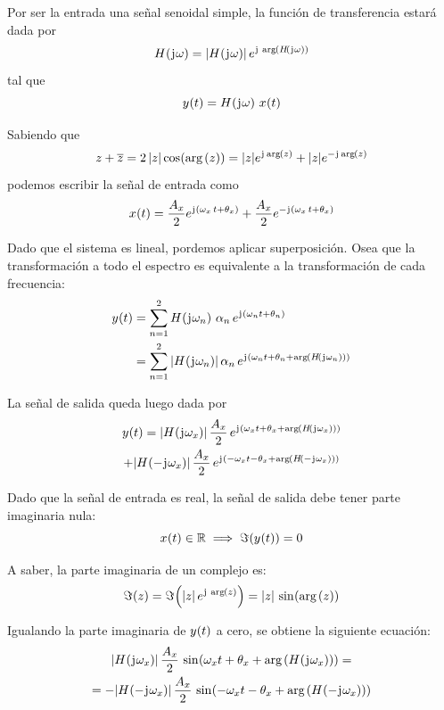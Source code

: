 Por ser la entrada una señal senoidal simple, la función de transferencia estará dada por
\[
    \fx[H]{\iu \omega} = \norm{\fx[H]{\iu \omega}} \, e^{\iu \, \fx[\arg]{\fx[H]{\iu \omega}}}
\]
tal que
\[
    \fx[y]{t} = \fx[H]{\iu \omega} \, \fx[x]{t}
\]

Sabiendo que
\[
    z + \conj{z} = 2 \, \norm{z} \fx[\cos]{\fx[\arg]{z}}
    = \norm{z} e^{\iu \fx[\arg]{z}} + \norm{z} e^{- \iu \fx[\arg]{z}}
\]
podemos escribir la señal de entrada como
\[
    \fx[x]{t} = \frac{A_x}{2} e^{\iu \inParentheses{\omega_x \, t + \theta_x}}
    + \frac{A_x}{2} e^{- \iu \inParentheses{\omega_x \, t + \theta_x}}
\]

Dado que el sistema es lineal, pordemos aplicar superposición.
Osea que la transformación a todo el espectro es equivalente a la transformación de cada frecuencia:
\begin{align*}
    \fx[y]{t} & = \sum_{\nth=1}^{2} \fx[H]{\iu \omega_\nth}
    \, \alpha_\nth
    \, e^{\iu \inParentheses{\omega_\nth t + \theta_\nth}}
    \\
    & = \sum_{\nth=1}^{2} \norm{\fx[H]{\iu \omega_\nth}}
    \, \alpha_\nth
    \, e^{\iu \inParentheses{\omega_\nth t + \theta_\nth + \fx[\arg]{\fx[H]{\iu \omega_\nth}}}}
\end{align*}

La señal de salida queda luego dada por
\begin{multline*}
    \fx[y]{t} = \norm{\fx[H]{\iu \omega_x}}
    \, \frac{A_x}{2}
    \, e^{\iu \inParentheses{\omega_x t + \theta_x + \fx[\arg]{\fx[H]{\iu \omega_x}}}}
    \\
    + \norm{\fx[H]{- \iu \omega_x}}
    \, \frac{A_x}{2}
    \, e^{\iu \inParentheses{- \omega_x t - \theta_x + \fx[\arg]{\fx[H]{- \iu \omega_x}}}}
\end{multline*}

Dado que la señal de entrada es real, la señal de salida debe tener parte imaginaria nula:
\begin{equation*}
    \fx[x]{t} \in \setR \implies \fx[\Im]{\fx[y]{t}} = 0
\end{equation*}

A saber, la parte imaginaria de un complejo es:
\begin{equation*}
    \fx[\Im]{z} = \fx[\Im]{\norm{z} \, e^{\iu \, \fx[\arg]{z}}}
    = \norm{z} \, \fx[\sin]{\fx[\arg]{z}}
\end{equation*}

Igualando la parte imaginaria de $\fx[y]{t}$ a cero, se obtiene la siguiente ecuación:
\begin{multline*}
    \norm{\fx[H]{\iu \omega_x}}
    \, \frac{A_x}{2}
    \, \fx[\sin]{\omega_x t + \theta_x + \fx[\arg]{\fx[H]{\iu \omega_x}}}
    =
    \\
    =
    - \norm{\fx[H]{- \iu \omega_x}}
    \, \frac{A_x}{2}
    \, \fx[\sin]{- \omega_x t - \theta_x + \fx[\arg]{\fx[H]{- \iu \omega_x}}}
\end{multline*}

